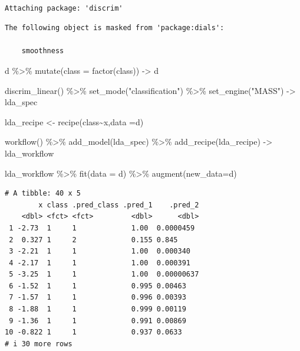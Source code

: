 \documentclass[
  letterpaper,
  DIV=11,
  numbers=noendperiod]{scrreprt}
\newenvironment{Shaded}{\begin{snugshade}}{\end{snugshade}}
\newcommand{\AttributeTok}[1]{\textcolor[rgb]{0.65,0.35,0.00}{#1}}
\newcommand{\FunctionTok}[1]{\textcolor[rgb]{0.02,0.16,0.49}{#1}}
\newcommand{\NormalTok}[1]{\textcolor[rgb]{0.33,0.33,0.33}{#1}}
\newcommand{\OtherTok}[1]{\textcolor[rgb]{0.85,0.12,0.09}{#1}}
\newcommand{\SpecialCharTok}[1]{\textcolor[rgb]{0.00,0.46,0.62}{#1}}
\newcommand{\StringTok}[1]{\textcolor[rgb]{0.00,0.50,0.00}{#1}}
\begin{document}
{\begin{verbatim}

Attaching package: 'discrim'
\end{verbatim}

\begin{verbatim}
The following object is masked from 'package:dials':

    smoothness
\end{verbatim}

\begin{Shaded}
\begin{Highlighting}[]
\NormalTok{d }\SpecialCharTok{\%\textgreater{}\%} \FunctionTok{mutate}\NormalTok{(}\AttributeTok{class =} \FunctionTok{factor}\NormalTok{(class)) }\OtherTok{{-}\textgreater{}}\NormalTok{ d}

\FunctionTok{discrim\_linear}\NormalTok{() }\SpecialCharTok{\%\textgreater{}\%} 
  \FunctionTok{set\_mode}\NormalTok{(}\StringTok{"classification"}\NormalTok{) }\SpecialCharTok{\%\textgreater{}\%} 
  \FunctionTok{set\_engine}\NormalTok{(}\StringTok{"MASS"}\NormalTok{) }\OtherTok{{-}\textgreater{}}\NormalTok{ lda\_spec}

\NormalTok{lda\_recipe }\OtherTok{\textless{}{-}} \FunctionTok{recipe}\NormalTok{(class}\SpecialCharTok{\textasciitilde{}}\NormalTok{x,}\AttributeTok{data =}\NormalTok{d)}

\FunctionTok{workflow}\NormalTok{() }\SpecialCharTok{\%\textgreater{}\%} 
  \FunctionTok{add\_model}\NormalTok{(lda\_spec) }\SpecialCharTok{\%\textgreater{}\%} 
  \FunctionTok{add\_recipe}\NormalTok{(lda\_recipe) }\OtherTok{{-}\textgreater{}}\NormalTok{ lda\_workflow}

\NormalTok{lda\_workflow }\SpecialCharTok{\%\textgreater{}\%} 
  \FunctionTok{fit}\NormalTok{(}\AttributeTok{data =}\NormalTok{ d) }\SpecialCharTok{\%\textgreater{}\%} 
  \FunctionTok{augment}\NormalTok{(}\AttributeTok{new\_data=}\NormalTok{d) }
\end{Highlighting}
\end{Shaded}

\begin{verbatim}
# A tibble: 40 x 5
        x class .pred_class .pred_1    .pred_2
    <dbl> <fct> <fct>         <dbl>      <dbl>
 1 -2.73  1     1             1.00  0.0000459 
 2  0.327 1     2             0.155 0.845     
 3 -2.21  1     1             1.00  0.000340  
 4 -2.17  1     1             1.00  0.000391  
 5 -3.25  1     1             1.00  0.00000637
 6 -1.52  1     1             0.995 0.00463   
 7 -1.57  1     1             0.996 0.00393   
 8 -1.88  1     1             0.999 0.00119   
 9 -1.36  1     1             0.991 0.00869   
10 -0.822 1     1             0.937 0.0633    
# i 30 more rows
\end{verbatim}
\end{document}
